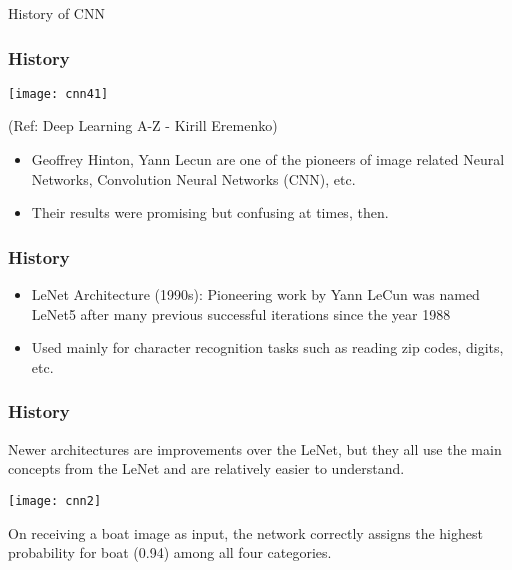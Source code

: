 \begin{frame}
  \begin{center}
    {\Large History of CNN }
  \end{center}
\end{frame}



\begin{frame}[fragile] \frametitle{History}

\begin{center}
\texttt{[image: cnn41]}

\tiny{(Ref: Deep Learning A-Z - Kirill Eremenko)}
\end{center}

\begin{itemize}
\item Geoffrey Hinton, Yann Lecun are one of the pioneers of image related Neural Networks, Convolution Neural Networks (CNN), etc.
\item Their results were promising but confusing at times, then.
\end{itemize}


\end{frame}

\begin{frame}[fragile] \frametitle{History}


\begin{itemize}
\item LeNet Architecture (1990s): Pioneering work by Yann LeCun was named LeNet5 after many previous successful iterations since the year 1988 
\item Used mainly for character recognition tasks such as reading zip codes, digits, etc.

\end{itemize}
\end{frame}

\begin{frame}[fragile] \frametitle{History}
Newer architectures are improvements over the LeNet, but they all use the main concepts from the LeNet and are relatively easier to understand.

\begin{center}
\texttt{[image: cnn2]}
\end{center}
On receiving a boat image as input, the network correctly assigns the highest probability for boat (0.94) among all four categories. 
\end{frame}



